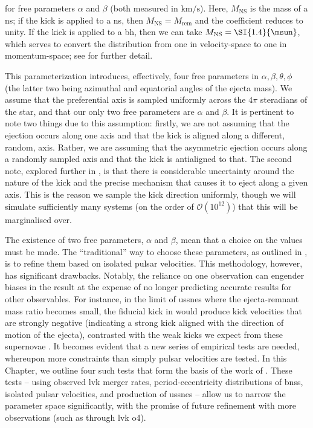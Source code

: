 for free parameters $\alpha$ and $\beta$ (both measured in $\si{\km\per\second}$). Here, $M_\text{NS}$ is the mass of a \gls{ns}; if the kick is applied to a \gls{ns}, then $M_\text{NS}=M_\text{rem}$ and the coefficient reduces to unity. If the kick is applied to a \gls{bh}, then we can take $M_\text{NS}=\SI{1.4}{\msun}$, which serves to convert the distribution from one in velocity-space to one in momentum-space; see \citet{Bray:2016, Bray:2018, Richards:2023} for further detail.

This parameterization introduces, effectively, four free parameters in $\alpha, \beta, \theta, \phi$ (the latter two being azimuthal and equatorial angles of the ejecta mass). We assume that the preferential axis is sampled uniformly across the $4\pi$ steradians of the star, and that our only two free parameters are $\alpha$ and $\beta$. It is pertinent to note two things due to this assumption: firstly, we are not assuming that the ejection occurs along one axis and that the kick is aligned along a different, random, axis. Rather, we are assuming that the asymmetric ejection occurs along a randomly sampled axis and that the kick is antialigned to that. The second note, explored further in , is that there is considerable uncertainty around the nature of the kick and the precise mechanism that causes it to eject along a given axis. This is the reason we sample the kick direction uniformly, though we will simulate sufficiently many systems (on the order of $\mathcal{O}(10^{12})$) that this will be marginalised over.

The existence of two free parameters, $\alpha$ and $\beta$, mean that a choice on the values must be made. The ``traditional'' way to choose these parameters, as outlined in \citet{Bray:2016, Bray:2018}, is to refine them based on isolated pulsar velocities. This methodology, however, has significant drawbacks. Notably, the reliance on one observation can engender biases in the result at the expense of no longer predicting accurate results for other observables. For instance, in the limit of \glspl{ussne} where the ejecta-remnant mass ratio becomes small, the fiducial kick in \citet{Bray:2018} would produce kick velocities that are strongly negative (indicating a strong kick aligned with the direction of motion of the ejecta), contrasted with the weak kicks we expect from these supernovae \citep[e.g.,][]{Willcox:2021}. It becomes evident that a new series of empirical tests are needed, whereupon more constraints than simply pulsar velocities are tested. In this Chapter, we outline four such tests that form the basis of the work of \citet{Richards:2023}. These tests -- using observed \gls{lvk} merger rates, period-eccentricity distributions of \glspl{bns}, isolated pulsar velocities, and production of \glspl{ussne} -- allow us to narrow the parameter space significantly, with the promise of future refinement with more observations (such as through \gls{lvk} \gls{o4}).

